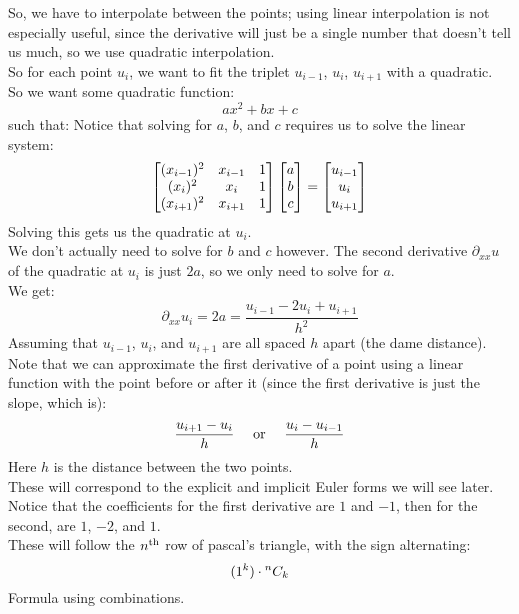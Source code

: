 \documentclass[12pt]{article}
\begin{document}
So, we have to interpolate between the points;
using linear interpolation is not especially useful,
since the derivative will just be a single
number that doesn't tell us much,
so we use quadratic interpolation. \\
So for each point $u_i$,
we want to fit the triplet $u_{i-1}$, $u_{i}$,
$u_{i+1}$ with a quadratic. \\

So we want some quadratic function:
\[ ax^2 + bx + c \]
such that:
Notice that solving for $a$, $b$, and $c$
requires us to solve the linear system:
\[ \begin{bmatrix} (x_{i-1})^2 & x_{i-1} & 1 \\
(x_{i})^2 & x_{i} & 1 \\
(x_{i+1})^2 & x_{i+1} & 1 \\ \end{bmatrix} 
\begin{bmatrix} a \\ b \\ c \end{bmatrix} = 
\begin{bmatrix} u_{i-1} \\ u_{i} \\ u_{i+1} \end{bmatrix}\]
Solving this gets us the quadratic
at $u_i$. \\

We don't actually need to solve for $b$
and $c$ however.
The second derivative $\partial_{xx} u$
of the quadratic at $u_i$ is just $2a$,
so we only need to solve for $a$. \\
We get:
\[ \partial_{xx} u_i = 2a = 
\dfrac{u_{i-1} - 2u_{i} + u_{i+1}}{h^2} \]
Assuming that $u_{i-1}$, $u_i$, and $u_{i+1}$
are all spaced $h$ apart (the dame distance). \\

Note that we can approximate the first
derivative of a point using a linear function
with the point before or after it (since the
first derivative is just the slope, which is):
\[ \dfrac{u_{i+1} - u_{i}}{h}
\quad \text{ or } \quad \dfrac{u_i - u_{i-1}}{h} \]
Here $h$ is the distance between the two points. \\
These will correspond to the explicit and implicit
Euler forms we will see later. \\

Notice that the coefficients for the first
derivative are $1$ and $-1$,
then for the second, are $1$, $-2$, and $1$. \\
These will follow the $n^{\text{th}}$ row of pascal's triangle,
with the sign alternating:
\[ (1^{k}) \cdot {}^{n}C_{k}\]
Formula using combinations. \\
\end{document}
